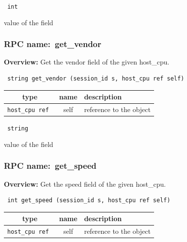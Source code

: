 {\tt 
int
}


value of the field
\vspace{0.3cm}
\vspace{0.3cm}
\vspace{0.3cm}
\subsubsection{RPC name:~get\_vendor}

{\bf Overview:} 
Get the vendor field of the given host\_cpu.

\begin{verbatim} string get_vendor (session_id s, host_cpu ref self)\end{verbatim}



 
\vspace{0.3cm}
\begin{tabular}{|c|c|p{7cm}|}
 \hline
{\bf type} & {\bf name} & {\bf description} \\ \hline
{\tt host\_cpu ref } & self & reference to the object \\ \hline 

\end{tabular}

\vspace{0.3cm}

{\tt 
string
}


value of the field
\vspace{0.3cm}
\vspace{0.3cm}
\vspace{0.3cm}
\subsubsection{RPC name:~get\_speed}

{\bf Overview:} 
Get the speed field of the given host\_cpu.

\begin{verbatim} int get_speed (session_id s, host_cpu ref self)\end{verbatim}



 
\vspace{0.3cm}
\begin{tabular}{|c|c|p{7cm}|}
 \hline
{\bf type} & {\bf name} & {\bf description} \\ \hline
{\tt host\_cpu ref } & self & reference to the object \\ \hline 

\end{tabular}

